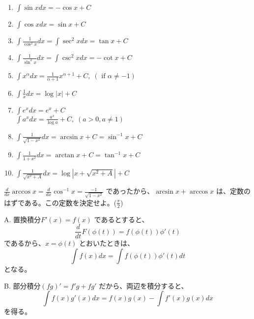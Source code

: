 \begin{eg}
\begin{enumerate}
\item ${\displaystyle \int \sin x dx = -\cos x + C}$
\item ${\displaystyle \int \cos x dx = \sin x + C}$
\item ${\displaystyle \int \frac{1}{\cos^2 x}dx = \int \sec^2 xdx = \tan x + C}$
\item ${\displaystyle \int \frac{1}{\sin^2 x}dx = \int \csc^2 xdx = -\cot x + C}$
\item ${\displaystyle \int x^\alpha dx = \frac{1}{\alpha+1}x^{\alpha+1} + C, \;(\mbox{ if }\alpha\neq -1)}$
\item ${\displaystyle \int \frac1x dx = \log|x| + C}$
\item ${\displaystyle \int e^x dx = e^x + C}$\\
${\displaystyle \int a^x dx = \frac{a^x}{\log a} + C,\;(a>0, a\neq 1)}$
\item ${\displaystyle \int \frac{1}{\sqrt{1-x^2}} dx = \arcsin x + C = \sin^{-1}x + C}$
\item ${\displaystyle \int \frac{1}{1+x^2} dx = \arctan x + C = \tan^{-1}x + C}$
\item ${\displaystyle \int \frac{1}{\sqrt{x^2+A}} dx = \log|x+\sqrt{x^2+A}| + C}$
\end{enumerate}
\end{eg}

\begin{eg}
${\displaystyle \frac{d}{dx}\arccos x = \frac{d}{dx}\cos^{-1}x = \frac{-1}{\sqrt{1-x^2}}}$ であったから、$\arcsin x + \arccos x$ は、定数のはずである。この定数を決定せよ。\hfill ($\frac{\pi}2$)
\end{eg}

\newpage{}
A. {\gt 置換積分}\quad $F'(x) = f(x)$ であるとすると、
$$\frac{d}{dt} F(\phi(t)) = f(\phi(t))\phi'(t)$$
であるから、$x = \phi(t)$ とおいたときは、
$$\int f(x)dx = \int f(\phi(t))\phi'(t)dt$$
となる。

\medskip
B. {\gt 部分積分}\quad $(fg)' = f'g + fg'$  だから、両辺を積分すると、
$$\int f(x)g'(x)dx = f(x)g(x) - \int f'(x)g(x)dx$$
を得る。

